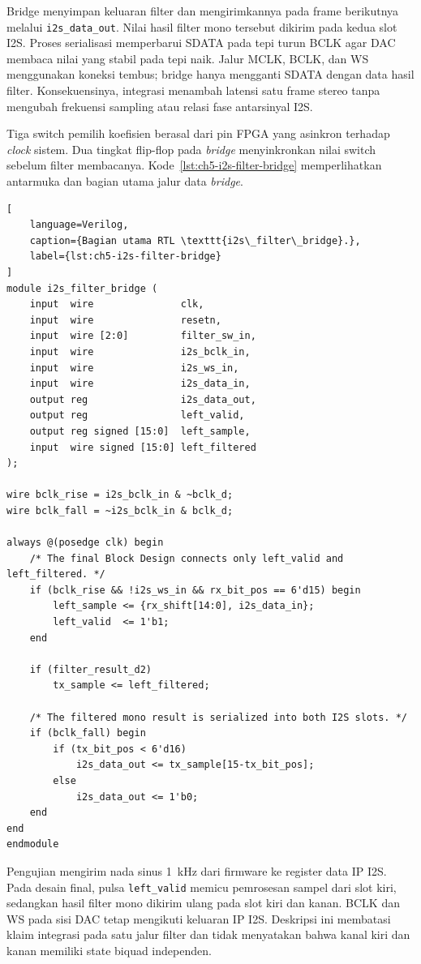 Bridge menyimpan keluaran filter dan mengirimkannya pada frame berikutnya melalui \texttt{i2s\_data\_out}. Nilai hasil filter mono tersebut dikirim pada kedua slot I2S. Proses serialisasi memperbarui SDATA pada tepi turun BCLK agar DAC membaca nilai yang stabil pada tepi naik. Jalur MCLK, BCLK, dan WS menggunakan koneksi tembus; bridge hanya mengganti SDATA dengan data hasil filter. Konsekuensinya, integrasi menambah latensi satu frame stereo tanpa mengubah frekuensi sampling atau relasi fase antarsinyal I2S.

Tiga switch pemilih koefisien berasal dari pin FPGA yang asinkron terhadap \textit{clock} sistem. Dua tingkat flip-flop pada \textit{bridge} menyinkronkan nilai switch sebelum filter membacanya. Kode~\ref{lst:ch5-i2s-filter-bridge} memperlihatkan antarmuka dan bagian utama jalur data \textit{bridge}.

\begin{lstlisting}[
	language=Verilog,
	caption={Bagian utama RTL \texttt{i2s\_filter\_bridge}.},
	label={lst:ch5-i2s-filter-bridge}
]
module i2s_filter_bridge (
    input  wire               clk,
    input  wire               resetn,
    input  wire [2:0]         filter_sw_in,
    input  wire               i2s_bclk_in,
    input  wire               i2s_ws_in,
    input  wire               i2s_data_in,
    output reg                i2s_data_out,
    output reg                left_valid,
    output reg signed [15:0]  left_sample,
    input  wire signed [15:0] left_filtered
);

wire bclk_rise = i2s_bclk_in & ~bclk_d;
wire bclk_fall = ~i2s_bclk_in & bclk_d;

always @(posedge clk) begin
    /* The final Block Design connects only left_valid and left_filtered. */
    if (bclk_rise && !i2s_ws_in && rx_bit_pos == 6'd15) begin
        left_sample <= {rx_shift[14:0], i2s_data_in};
        left_valid  <= 1'b1;
    end

    if (filter_result_d2)
        tx_sample <= left_filtered;

    /* The filtered mono result is serialized into both I2S slots. */
    if (bclk_fall) begin
        if (tx_bit_pos < 6'd16)
            i2s_data_out <= tx_sample[15-tx_bit_pos];
        else
            i2s_data_out <= 1'b0;
    end
end
endmodule
\end{lstlisting}

Pengujian mengirim nada sinus 1~kHz dari firmware ke register data IP I2S. Pada desain final, pulsa \texttt{left\_valid} memicu pemrosesan sampel dari slot kiri, sedangkan hasil filter mono dikirim ulang pada slot kiri dan kanan. BCLK dan WS pada sisi DAC tetap mengikuti keluaran IP I2S. Deskripsi ini membatasi klaim integrasi pada satu jalur filter dan tidak menyatakan bahwa kanal kiri dan kanan memiliki state biquad independen.

